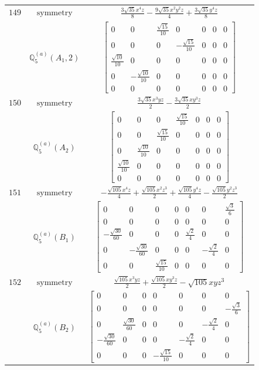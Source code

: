 \documentclass[fleqn,8pt,landscape]{jsarticle}
\begin{document}
\begin{longtable}{ccc}
$ 149 $ & $ \text{symmetry} $ & $ \frac{3 \sqrt{35} x^{4} z}{8} - \frac{9 \sqrt{35} x^{2} y^{2} z}{4} + \frac{3 \sqrt{35} y^{4} z}{8} $ \\
$  $ & $ \mathbb{Q}_{5}^{(a)}(A_{1},2) $ & $ \begin{bmatrix} 0 & 0 & \frac{\sqrt{15}}{10} & 0 & 0 & 0 & 0 \\ 0 & 0 & 0 & - \frac{\sqrt{15}}{10} & 0 & 0 & 0 \\ \frac{\sqrt{10}}{10} & 0 & 0 & 0 & 0 & 0 & 0 \\ 0 & - \frac{\sqrt{10}}{10} & 0 & 0 & 0 & 0 & 0 \\ 0 & 0 & 0 & 0 & 0 & 0 & 0 \end{bmatrix} $ \\ \hline
$ 150 $ & $ \text{symmetry} $ & $ \frac{3 \sqrt{35} x^{3} y z}{2} - \frac{3 \sqrt{35} x y^{3} z}{2} $ \\
$  $ & $ \mathbb{Q}_{5}^{(a)}(A_{2}) $ & $ \begin{bmatrix} 0 & 0 & 0 & \frac{\sqrt{15}}{10} & 0 & 0 & 0 \\ 0 & 0 & \frac{\sqrt{15}}{10} & 0 & 0 & 0 & 0 \\ 0 & \frac{\sqrt{10}}{10} & 0 & 0 & 0 & 0 & 0 \\ \frac{\sqrt{10}}{10} & 0 & 0 & 0 & 0 & 0 & 0 \\ 0 & 0 & 0 & 0 & 0 & 0 & 0 \end{bmatrix} $ \\ \hline
$ 151 $ & $ \text{symmetry} $ & $ - \frac{\sqrt{105} x^{4} z}{4} + \frac{\sqrt{105} x^{2} z^{3}}{2} + \frac{\sqrt{105} y^{4} z}{4} - \frac{\sqrt{105} y^{2} z^{3}}{2} $ \\
$  $ & $ \mathbb{Q}_{5}^{(a)}(B_{1}) $ & $ \begin{bmatrix} 0 & 0 & 0 & 0 & 0 & 0 & \frac{\sqrt{3}}{6} \\ 0 & 0 & 0 & 0 & 0 & 0 & 0 \\ - \frac{\sqrt{30}}{60} & 0 & 0 & 0 & \frac{\sqrt{2}}{4} & 0 & 0 \\ 0 & - \frac{\sqrt{30}}{60} & 0 & 0 & 0 & - \frac{\sqrt{2}}{4} & 0 \\ 0 & 0 & \frac{\sqrt{15}}{10} & 0 & 0 & 0 & 0 \end{bmatrix} $ \\ \hline
$ 152 $ & $ \text{symmetry} $ & $ \frac{\sqrt{105} x^{3} y z}{2} + \frac{\sqrt{105} x y^{3} z}{2} - \sqrt{105} x y z^{3} $ \\
$  $ & $ \mathbb{Q}_{5}^{(a)}(B_{2}) $ & $ \begin{bmatrix} 0 & 0 & 0 & 0 & 0 & 0 & 0 \\ 0 & 0 & 0 & 0 & 0 & 0 & - \frac{\sqrt{3}}{6} \\ 0 & \frac{\sqrt{30}}{60} & 0 & 0 & 0 & - \frac{\sqrt{2}}{4} & 0 \\ - \frac{\sqrt{30}}{60} & 0 & 0 & 0 & - \frac{\sqrt{2}}{4} & 0 & 0 \\ 0 & 0 & 0 & - \frac{\sqrt{15}}{10} & 0 & 0 & 0 \end{bmatrix} $ \\ \hline

\end{longtable}
\end{document}
